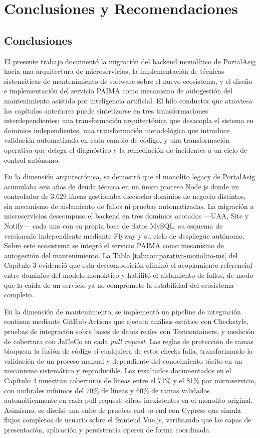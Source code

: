 \chapter{Conclusiones y Recomendaciones}
\label{ch:conclusiones}
\pagestyle{fancy}

\section{Conclusiones}

El presente trabajo documentó la migración del backend monolítico de PortalAsig
hacia una arquitectura de microservicios, la implementación de técnicas sistemáticas
de mantenimiento de software sobre el nuevo ecosistema, y el diseño e implementación del servicio
PAIMA como mecanismo de autogestión del mantenimiento asistido por inteligencia
artificial. El hilo conductor que atraviesa los capítulos anteriores puede sintetizarse
en tres transformaciones interdependientes: una transformación arquitectónica que
desacopla el sistema en dominios independientes, una transformación metodológica
que introduce validación automatizada en cada cambio de código, y una transformación
operativa que delega el diagnóstico y la remediación de incidentes a un ciclo de control
autónomo.

En la dimensión arquitectónica, se demostró que el monolito legacy de PortalAsig
acumulaba seis años de deuda técnica en un único proceso Node.js donde un
controlador de 3.629 líneas gestionaba dieciocho dominios de negocio distintos, sin
mecanismo de aislamiento de fallos ni pruebas automatizadas. La migración a
microservicios descompuso el backend en tres dominios acotados ---UAA, Site y
Notify--- cada uno con su propia base de datos MySQL, su esquema de
versionado independiente mediante Flyway y su ciclo de despliegue autónomo. Sobre
este ecosistema se integró el servicio PAIMA como mecanismo de autogestión del
mantenimiento. La
Tabla \ref{tab:comparativa-monolito-ms} del Capítulo 3 evidenció que esta
descomposición eliminó el acoplamiento referencial entre dominios del modelo monolítico y habilitó
el aislamiento de fallos, de modo que la caída de un servicio ya no compromete la
estabilidad del ecosistema completo.

En la dimensión de mantenimiento, se implementó un pipeline de integración continua
mediante GitHub Actions que ejecuta análisis estático con Checkstyle, pruebas de
integración sobre bases de datos reales con Testcontainers, y medición de cobertura
con JaCoCo en cada \textit{pull request}. Las reglas de protección de ramas bloquean la
fusión de código si cualquiera de estos checks falla, transformando la validación de
un proceso manual y dependiente del conocimiento tácito en un mecanismo sistemático
y reproducible. Los resultados documentados en el Capítulo 4 muestran coberturas de
líneas entre el 71\% y el 81\% por microservicio, con umbrales mínimos del 70\% de
líneas y 60\% de ramas validados automáticamente en cada pull request; cifras inexistentes en el monolito
original. Asimismo, se diseñó una suite de pruebas end-to-end con Cypress que
simula flujos completos de usuario sobre el frontend Vue.js, verificando que las
capas de presentación, aplicación y persistencia operen de forma coordinada.

